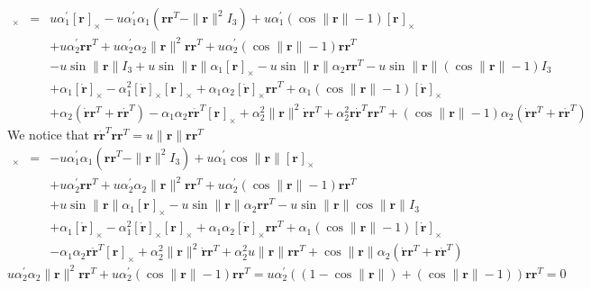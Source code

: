\documentclass {article}
\newcommand\rot{\mathbf{r}}
\newcommand\rcross[1]{[\rot_{#1}]_{\times}}
\newcommand\omegacross{[\omega]_{\times}}
\newcommand\rdotcross{\left[\dot{\rot}\right]_{\times}}
\newcommand\normr{\|\rot\|}
\newcommand\alphap{\alpha^{\prime}}
\begin{document}
\begin{eqnarray*}
\omegacross &=&
u \alphap_1 \rcross{} - u \alphap_1\alpha_1 (\rot\rot^T-\normr^2 I_3) + u \alphap_1 (\cos\normr-1) \rcross{}\\
&& + u\alphap_2 \rot\rot^T + u\alphap_2\alpha_2\normr^2\rot\rot^T + u\alphap_2 (\cos\normr-1) \rot\rot^T\\
&& -u \sin\normr I_3 + u \sin\normr\alpha_1 \rcross{} - u \sin\normr\alpha_2 \rot\rot^T - u \sin\normr(\cos\normr-1) I_3\\
&& +\alpha_1 \rdotcross - \alpha_1^2 \rdotcross\rcross{} + \alpha_1 \alpha_2 \rdotcross\rot\rot^T + \alpha_1(\cos\normr-1)\rdotcross\\
&&+\alpha_2 (\dot{\rot}\rot^T + \rot\dot{\rot}^T) - \alpha_1 \alpha_2 \rot\dot{\rot}^T\rcross{} +  \alpha_2^2\normr^2\dot{\rot}\rot^T + \alpha_2^2\rot\dot{\rot}^T\rot\rot^T + (\cos\normr-1)\alpha_2 (\dot{\rot}\rot^T + \rot\dot{\rot}^T)
\end{eqnarray*}
We notice that $\rot\dot{\rot}^T\rot\rot^T=u\normr\rot\rot^T$
\begin{eqnarray*}
\omegacross &=&
- u \alphap_1\alpha_1 (\rot\rot^T-\normr^2 I_3) + u \alphap_1 \cos\normr \rcross{}\\
&& + u\alphap_2 \rot\rot^T + u\alphap_2\alpha_2\normr^2\rot\rot^T + u\alphap_2 (\cos\normr-1) \rot\rot^T\\
&& + u \sin\normr\alpha_1 \rcross{} - u \sin\normr\alpha_2 \rot\rot^T - u \sin\normr\cos\normr I_3\\
&& +\alpha_1 \rdotcross - \alpha_1^2 \rdotcross\rcross{} + \alpha_1 \alpha_2 \rdotcross\rot\rot^T + \alpha_1(\cos\normr-1)\rdotcross\\
&&- \alpha_1 \alpha_2 \rot\dot{\rot}^T\rcross{} +  \alpha_2^2\normr^2\dot{\rot}\rot^T + \alpha_2^2u\normr\rot\rot^T + \cos\normr\alpha_2 (\dot{\rot}\rot^T + \rot\dot{\rot}^T)
\end{eqnarray*}
$$
u\alphap_2\alpha_2\normr^2\rot\rot^T + u\alphap_2 (\cos\normr-1) \rot\rot^T =
u\alphap_2((1-\cos\normr)+(\cos\normr-1)) \rot\rot^T = 0
$$
\end{document}
